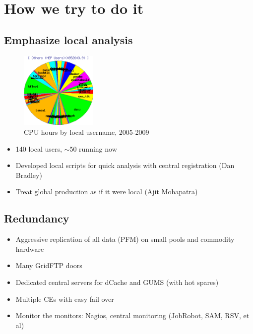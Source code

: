 \documentclass{beamer}
\newcommand{\ca}{\ensuremath{\sim}}
\begin{document}
\section{How we try to do it}
\subsection{Emphasize local analysis}
\begin{frame}
\begin{figure}
    \includegraphics[width=0.33\textwidth]{Graphics/condor-users.png}
    \caption{CPU hours by local username, 2005-2009}
\end{figure}

\begin{itemize}
    \item 140 local users, \ca{}50 running now
    \item Developed local scripts for quick analysis with central registration (Dan Bradley)
    \item Treat global production as if it were local (Ajit Mohapatra)
\end{itemize}
\end{frame}

\subsection{Redundancy}
\begin{frame}
\begin{itemize}
    \item Aggressive replication of all data (PFM) on small pools and commodity hardware
    \item Many GridFTP doors
    \item Dedicated central servers for dCache and GUMS (with hot spares)
    \item Multiple CEs with easy fail over
    \item Monitor the monitors: Nagios, central monitoring (JobRobot, SAM, RSV, et al)
\end{itemize}
\end{frame}
\end{document}
